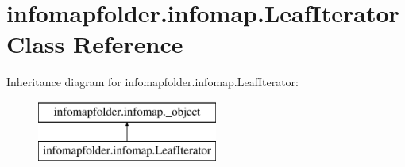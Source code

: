 \hypertarget{classinfomapfolder_1_1infomap_1_1LeafIterator}{}\section{infomapfolder.\+infomap.\+Leaf\+Iterator Class Reference}
\label{classinfomapfolder_1_1infomap_1_1LeafIterator}
Inheritance diagram for infomapfolder.\+infomap.\+Leaf\+Iterator\+:\begin{figure}[H]
\begin{center}
\leavevmode
\includegraphics[height=2.000000cm]{classinfomapfolder_1_1infomap_1_1LeafIterator}
\end{center}
\end{figure}
